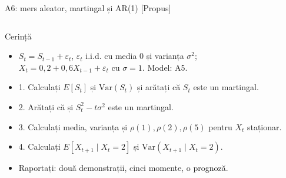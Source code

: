 \begin{frame}{A6: mers aleator, martingal și AR(1) [Propus]}
\propsub
\itemsize{\scriptsize}
\begin{columns}[T]
\begin{column}{\taskw}
\begin{block}{Cerință}
\begin{itemize}
    \item $S_t = S_{t-1} + \varepsilon_t$, $\varepsilon_t$ i.i.d. cu media 0 și varianța $\sigma^2$; $X_t = 0{,}2 + 0{,}6X_{t-1} + \varepsilon_t$ cu $\sigma = 1$. Model: A5.
    \item 1. Calculați $E[S_t]$ și $\text{Var}(S_t)$ și arătați că $S_t$ este un martingal.
    \item 2. Arătați că și $S_t^2 - t\sigma^2$ este un martingal.
    \item 3. Calculați media, varianța și $\rho(1), \rho(2), \rho(5)$ pentru $X_t$ staționar.
    \item 4. Calculați $E[X_{t+1} \mid X_t = 2]$ și $\text{Var}(X_{t+1} \mid X_t = 2)$.
    \item Raportați: două demonstrații, cinci momente, o prognoză.
\end{itemize}
\end{block}
\end{column}
\begin{column}{\solw}
\end{column}
\end{columns}
\end{frame}

